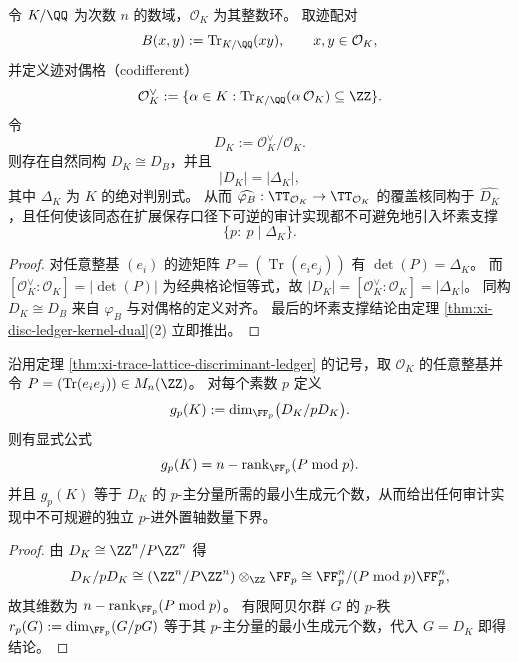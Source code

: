 \begin{theorem}[迹格的判别账本与坏素支撑]\label{thm:xi-trace-lattice-discriminant-ledger}
令 \(K/\QQ\) 为次数 \(n\) 的数域，\(\mathcal O_K\) 为其整数环。
取迹配对
\[
B(x,y):=\operatorname{Tr}_{K/\QQ}(xy),\qquad x,y\in\mathcal O_K,
\]
并定义迹对偶格（codifferent）
\[
\mathcal O_K^\vee:=\{\alpha\in K:\operatorname{Tr}_{K/\QQ}(\alpha\,\mathcal O_K)\subseteq \ZZ\}.
\]
令
\[
D_K:=\mathcal O_K^\vee/\mathcal O_K.
\]
则存在自然同构 \(D_K\cong D_B\)，并且
\[
|D_K|=|\Delta_K|,
\]
其中 \(\Delta_K\) 为 \(K\) 的绝对判别式。
从而 \(\widehat{\varphi_B}:\TT_{\mathcal O_K}\to\TT_{\mathcal O_K}\) 的覆盖核同构于 \(\widehat{D_K}\)，且任何使该同态在扩展保存口径下可逆的审计实现都不可避免地引入坏素支撑
\[
\{p:\ p\mid \Delta_K\}.
\]
\end{theorem}
\begin{proof}
对任意整基 \((e_i)\) 的迹矩阵 \(P=(\operatorname{Tr}(e_ie_j))\) 有 \(\det(P)=\Delta_K\)。
而 \([\mathcal O_K^\vee:\mathcal O_K]=|\det(P)|\) 为经典格论恒等式，故 \(|D_K|=[\mathcal O_K^\vee:\mathcal O_K]=|\Delta_K|\)。
同构 \(D_K\cong D_B\) 来自 \(\varphi_B\) 与对偶格的定义对齐。
最后的坏素支撑结论由定理 \ref{thm:xi-disc-ledger-kernel-dual}(2) 立即推出。
\end{proof}

\begin{proposition}\label{prop:xi-disc-ledger-local-axis-rank-defect}
沿用定理 \ref{thm:xi-trace-lattice-discriminant-ledger} 的记号，取 \(\mathcal O_K\) 的任意整基并令 \(P=(\operatorname{Tr}(e_ie_j))\in M_n(\ZZ)\)。
对每个素数 \(p\) 定义
\[
g_p(K):=\dim_{\FF_p}\bigl(D_K/pD_K\bigr).
\]
则有显式公式
\[
g_p(K)=n-\operatorname{rank}_{\FF_p}(P\bmod p).
\]
并且 \(g_p(K)\) 等于 \(D_K\) 的 \(p\)-主分量所需的最小生成元个数，从而给出任何审计实现中不可规避的独立 \(p\)-进外置轴数量下界。
\end{proposition}
\begin{proof}
由 \(D_K\cong \ZZ^n/P\ZZ^n\) 得
\[
D_K/pD_K\cong (\ZZ^n/P\ZZ^n)\otimes_{\ZZ}\FF_p\cong \FF_p^n/(P\bmod p)\FF_p^n,
\]
故其维数为 \(n-\operatorname{rank}_{\FF_p}(P\bmod p)\)。
有限阿贝尔群 \(G\) 的 \(p\)-秩 \(r_p(G):=\dim_{\FF_p}(G/pG)\) 等于其 \(p\)-主分量的最小生成元个数，代入 \(G=D_K\) 即得结论。
\end{proof}


